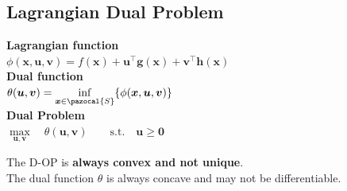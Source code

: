 \documentclass[english]{latex4ei/latex4ei_sheet}
\begin{document}
\begin{sectionbox}
	\subsection{Lagrangian Dual Problem}
	\begin{emphbox}
		\textbf{Lagrangian function} \\
		\vspace{0.3em}
		$\phi(\bm{x}, \bm{u}, \bm{v}) = f(\bm{x}) + \bm{u}^\intercal\bm{g}(\bm{x}) + \bm{v}^\intercal\bm{h}(\bm{x})$ \\
		\vspace{1em}
		\textbf{Dual function} \\
		\vspace{0.3em}
		$\theta(\bm{u}, \bm{v}) = \inf\limits_{\bm{x} \in \pazocal{S}} \{ \phi(\bm{x}, \bm{u}, \bm{v}) \}$ \\
		\vspace{1em}
		\textbf{Dual Problem} \\
		\vspace{0.3em}
		$\max\limits_{\bm{u}, \bm{v}} \quad \theta(\bm{u}, \bm{v}) \qquad \text{s.t.} \quad \bm{u} \geq \bm{0}$
	\end{emphbox}

	The D-OP is \textbf{always convex and not unique}. \\
	The dual function $\theta$ is always concave and may not be differentiable.

\end{sectionbox}
\end{document}
